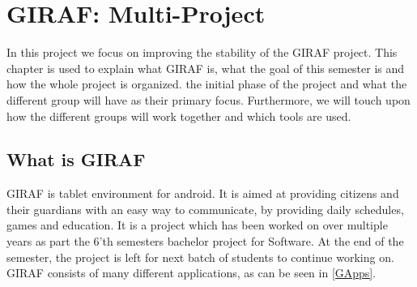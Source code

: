 \chapter{GIRAF: Multi-Project}

In this project we focus on improving the stability of the GIRAF project. This
chapter is used to explain what GIRAF is, what the goal of this semester is
and how the whole project is organized. the initial phase of the project and what the
different group will have as their primary focus. Furthermore, we will touch
upon how the different groups will work together and which tools are used.


\section{What is GIRAF}
GIRAF is tablet environment for android. It is aimed at providing citizens and
their guardians with an easy way to communicate, by providing daily schedules,
games and education. It is a project which has been worked on over multiple
years as part the 6'th semesters bachelor project for Software. At the end of
the semester, the project is left for next batch of students to continue working
on. GIRAF consists of many different applications, as can be seen in
\autoref{GApps}.

